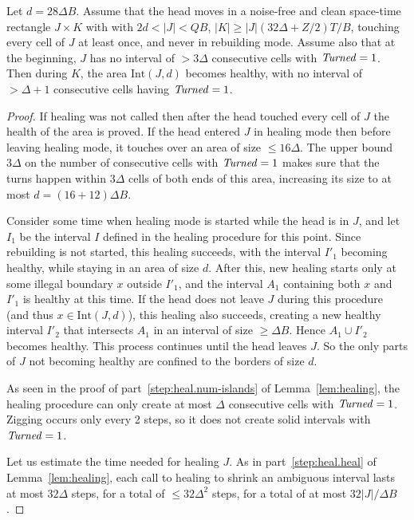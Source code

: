 \documentclass[11pt]{memoir}
\theoremstyle{definition} %
\renewcommand{\le}{\leq}
\renewcommand{\ge}{\geq}
\newcommand{\fld}[1]{\ensuremath{\textit{#1\/}}}
\def\B{B}
\newcommand{\Int}{\mathrm{Int}} %
\newcommand{\Q}{Q} %
\newcommand{\Tu}{T}
\newcommand{\Z}{Z} %
\newcommand{\Turned}{\fld{Turned}} %
\begin{document}
\begin{lemma}\label{lem:combined-heals}
 Let \( d = 28\Delta\B \).
 Assume that the head moves in a noise-free and clean space-time rectangle
  \( J\times K \) with with \( 2 d < |J|<\Q\B \), \( |K|\ge |J|(32\Delta + \Z/2)\Tu/\B \),
  touching every cell of \( J \) at least once, and never in rebuilding mode.
  Assume also that at the beginning, \( J \) has no interval of \( >3\Delta \) consecutive
  cells with \( \Turned=1 \).
  Then during \( K \), the area \( \Int(J, d) \) becomes healthy,
  with no interval of \( >\Delta+1 \) consecutive cells having \( \Turned=1 \).
\end{lemma}
\begin{proof}
  If healing was not called then after the head touched every cell of \( J \) the
  health of the area is proved.
  If the head entered \( J \) in healing mode then before leaving healing mode,
  it touches over an area of size \( \le 16\Delta \).
  The upper bound \( 3\Delta \) on the number of consecutive cells with \( \Turned=1 \)
  makes sure that the turns happen within \( 3\Delta \) cells of both ends of this area, increasing
  its size to at most \( d = (16+12)\Delta\B \).
  
  Consider some time when healing mode is started while the head is in \( J \),
  and let \( I_{1} \) be the interval \( I \) defined in the healing
  procedure for this point.
  Since rebuilding is not started, this healing succeeds, with the interval \( I'_{1} \)
  becoming healthy, while staying in an area of size \( d \).
  After this, new healing starts only at some illegal boundary \( x \) outside \( I'_{1} \),
  and the interval \( A_{1} \) containing both \( x \) and \( I'_{1} \) is healthy at this time.
  If the head does not leave \( J \) during this procedure (and thus \( x\in\Int(J,d) \)),
  this healing also succeeds, creating a new healthy interval \( I'_{2} \) that
  intersects \( A_{1} \) in an interval of size \( \ge\Delta\B \).
  Hence \( A_{1}\cup I'_{2} \) becomes healthy.
  This process continues until the head leaves \( J \).
  So the only parts of \( J \) not becoming healthy are confined to the borders
  of size \( d \).

  As seen in the proof of part~\ref{step:heal.num-islands} of Lemma~\ref{lem:healing},
  the healing procedure can only create at most \( \Delta \) consecutive cells with
  \( \Turned=1 \).
  Zigging occurs only every 2 steps, so it does not create solid intervals with \( \Turned=1 \).

  Let us estimate the time needed for healing \( J \).
  As in part~\ref{step:heal.heal} of Lemma~\ref{lem:healing}, each call to healing to shrink
  an ambiguous interval lasts at most \( 32\Delta \) steps, for a total of \( \le 32\Delta^{2} \) steps,
  for a total of at most \( 32|J|/\Delta\B \).


\end{proof}
\end{document}
